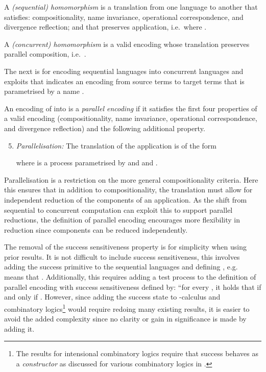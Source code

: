 \documentclass{llncs}
\begin{document}
\begin{definition}
\label{def:homo-seq}
A {\em (sequential) homomorphism} is
a translation  from one language to another that satisfies:
compositionality, name invariance, operational correspondence, and divergence reflection;
and that preserves application, i.e.~where .
\end{definition}

\begin{definition}
\label{def:homo-con}
A {\em (concurrent) homomorphism} is a valid encoding whose translation preserves parallel composition,
i.e.~.
\end{definition}

The next is for encoding sequential languages into concurrent languages and
exploits
that  indicates
an encoding from source terms to target terms that is parametrised by a name .

\begin{definition}
\label{def:pe}
An encoding  of  into 
is a {\em parallel encoding} if it satisfies the first four properties of a valid encoding
(compositionality, name invariance, operational correspondence, 
and divergence reflection)
and the following additional property.
\begin{enumerate}
\setcounter{enumi}{4}
\item {\em Parallelisation:} 
      The translation of the application  is of the form
      
      where  is a process parametrised by  and  and .
\end{enumerate}
\end{definition}


Parallelisation is a restriction on the more general compositionality criteria.
Here this ensures that in addition to compositionality, the translation must allow
for independent reduction of the components of an application.
As the shift from sequential to concurrent computation can exploit this to support parallel
reductions, the definition of parallel encoding 
encourages more flexibility in reduction since components can be reduced independently.

The removal of the success sensitiveness property is for simplicity when using prior
results.
It is not difficult to include success sensitiveness, this involves adding the success
primitive to the sequential languages and defining , e.g.~ means that
.
Additionally, this requires adding a test process  to the definition of parallel encoding
with success sensitiveness defined by:
``for every , it holds that  if and only if .
However, since adding the success state  to -calculus and combinatory
logics\footnote{The results for intensional combinatory logics require that success
behaves as a {\em constructor} as discussed for various combinatory logics in \cite{JayGW11}.}
would require redoing many existing results, it is easier to avoid the added
complexity since no clarity or gain in significance is made by adding it.
\end{document}
